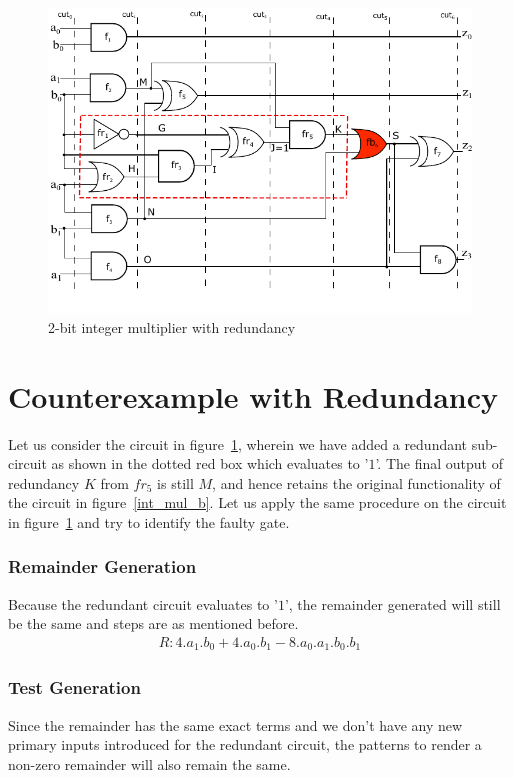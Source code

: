 \documentclass{article}
\begin{document}
\begin{figure}[ht]
	\begin{center}
	\includegraphics[scale = 0.94]{int_mul_red_b}
	\end{center}
	\vspace{-4ex}
	\caption{2-bit integer multiplier with redundancy}
	\label{int_mul_red_b}
	\vspace{-2ex}
\end{figure}

\section{Counterexample with Redundancy}
Let us consider the circuit in figure~\ref{int_mul_red_b}, wherein we have added a redundant sub-circuit as shown in the dotted red box which evaluates to '$1$'. The final output of redundancy $K$ from $fr_5$ is still $M$, and hence retains the original functionality of the circuit in figure~\ref{int_mul_b}. Let us apply the same procedure on the circuit in figure~\ref{int_mul_red_b} and try to identify the faulty gate.

\subsubsection{Remainder Generation}
Because the redundant circuit evaluates to '$1$', the remainder generated will still be the same and steps are as mentioned before.
\begin{align*}
R: 4.a_1.b_0 + 4.a_0.b_1 - 8.a_0.a_1.b_0.b_1
\end{align*}

\subsubsection{Test Generation}
Since the remainder has the same exact terms and we don't have any new primary inputs introduced for the redundant circuit, the patterns to render a non-zero remainder will also remain the same.
\end{document}

